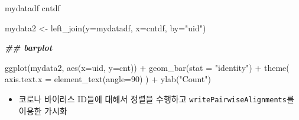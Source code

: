 \documentclass[
]{book}
\newenvironment{Shaded}{\begin{snugshade}}{\end{snugshade}}
\newcommand{\AttributeTok}[1]{\textcolor[rgb]{0.77,0.63,0.00}{#1}}
\newcommand{\DecValTok}[1]{\textcolor[rgb]{0.00,0.00,0.81}{#1}}
\newcommand{\DocumentationTok}[1]{\textcolor[rgb]{0.56,0.35,0.01}{\textbf{\textit{#1}}}}
\newcommand{\FunctionTok}[1]{\textcolor[rgb]{0.00,0.00,0.00}{#1}}
\newcommand{\NormalTok}[1]{#1}
\newcommand{\OtherTok}[1]{\textcolor[rgb]{0.56,0.35,0.01}{#1}}
\newcommand{\SpecialCharTok}[1]{\textcolor[rgb]{0.00,0.00,0.00}{#1}}
\newcommand{\StringTok}[1]{\textcolor[rgb]{0.31,0.60,0.02}{#1}}
\providecommand{\tightlist}{%
  \setlength{\itemsep}{0pt}\setlength{\parskip}{0pt}}
\begin{document}
\begin{Shaded}
\begin{Highlighting}[]
\NormalTok{mydatadf}
\NormalTok{cntdf}

\NormalTok{mydata2 }\OtherTok{\textless{}{-}} \FunctionTok{left\_join}\NormalTok{(}\AttributeTok{y=}\NormalTok{mydatadf, }\AttributeTok{x=}\NormalTok{cntdf, }\AttributeTok{by=}\StringTok{"uid"}\NormalTok{) }


\DocumentationTok{\#\# barplot}

\FunctionTok{ggplot}\NormalTok{(mydata2, }\FunctionTok{aes}\NormalTok{(}\AttributeTok{x=}\NormalTok{uid, }\AttributeTok{y=}\NormalTok{cnt)) }\SpecialCharTok{+}
  \FunctionTok{geom\_bar}\NormalTok{(}\AttributeTok{stat =} \StringTok{"identity"}\NormalTok{) }\SpecialCharTok{+}
  \FunctionTok{theme}\NormalTok{(}
    \AttributeTok{axis.text.x =} \FunctionTok{element\_text}\NormalTok{(}\AttributeTok{angle=}\DecValTok{90}\NormalTok{)}
\NormalTok{  ) }\SpecialCharTok{+}
  \FunctionTok{ylab}\NormalTok{(}\StringTok{"Count"}\NormalTok{)}
\end{Highlighting}
\end{Shaded}

\begin{itemize}
\tightlist
\item
  코로나 바이러스 ID들에 대해서 정렬을 수행하고 \texttt{writePairwiseAlignments}를 이용한 가시화
\end{itemize}
\end{document}
